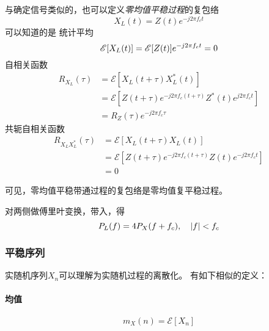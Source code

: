     与确定信号类似的，也可以定义\emph{零均值平稳过程}的复包络
    \begin{equation}
        X_L(t)=Z(t)e^{-j2\pi f_ct}
    \end{equation}
    可以知道的是
    统计平均
    \begin{equation}
        \mathscr{E}[X_L(t)]=\mathscr{E}[Z(t)]e^{-j2\pi f_ct}=0\\
    \end{equation}
    自相关函数
    \begin{equation}\label{eq:fubaoluozixiangguan}
        \begin{split}
            R_{X_L}(\tau)&=\mathscr{E}[X_L(t+\tau)X^*_L(t)]\\
                         &=\mathscr{E}[Z(t+\tau)e^{-j2\pi f_c(t+\tau)}Z^*(t)e^{j2\pi f_ct}]\\
                         &=R_Z(\tau)e^{-j2\pi f_c\tau}
        \end{split}
    \end{equation}
    共轭自相关函数
    \begin{equation}
        \begin{split}
            R_{X_LX_L^*}(\tau)  &=\mathscr{E}[X_L(t+\tau)X_L(t)]\\
                                &=\mathscr{E}[Z(t+\tau)e^{-j2\pi f_c(t+\tau)}Z(t)e^{-j2\pi f_ct}]\\
                                &=0
        \end{split}
    \end{equation}

    可见，零均值平稳带通过程的复包络是零均值复平稳过程。

    对两侧做傅里叶变换，带入，得
    \begin{equation}
        P_L(f)=4P_X(f+f_c),\hspace{1em}\left\vert f \right\vert<f_c
    \end{equation}
    
    \subsubsection{平稳序列}
    实随机序列$X_n$可以理解为实随机过程的离散化。
    有如下相似的定义：

    \paragraph{均值}
    \begin{equation}
        m_X(n)=\mathscr{E}[X_n]
    \end{equation}
